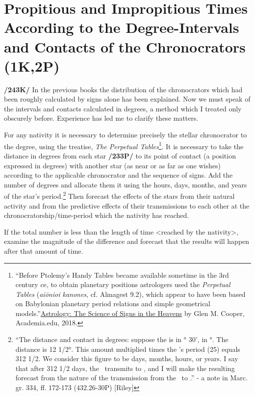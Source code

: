 \section{Propitious and Impropitious Times According to the Degree-Intervals and Contacts of the Chronocrators (1K,2P)}
\textbf{/243K/} In the previous books the distribution of the chronocrators which had been roughly calculated by signs alone has been explained. Now we must speak of the intervals and contacts calculated in degrees, a method which I treated only obscurely before. Experience has led me to clarify these matters.

For any nativity it is necessary to determine precisely the stellar chronocrator to the degree, using the treatise, \textsl{The Perpetual Tables}\footnote{``Before Ptolemy’s Handy Tables became available sometime in the 3rd century ce, to obtain planetary positions astrologers used the \textsl{Perpetual Tables} (\textsl{aiōnioi kanones}, cf. Almagest 9.2), which appear to have been based on Babylonian planetary period relations and simple geometrical models.''\href{https://www.academia.edu/31038622/_Astrology_The_Science_of_Signs_in_the_Heavens_In_The_Oxford_Handbook_to_Science_and_Medicine_in_the_Classical_World_edited_by_P_T_Keyser_and_J_Scarborough_Oxford_PROOFS_2018_} {Astrology: The Science of Signs in the Heavens} by Glen M. Cooper, Academia.edu, 2018.}. It is necessary to take the distance in degrees from each star \textbf{/233P/} to its point of contact (a position expressed in degrees) with another star (as near or as far as one wishes) according to the applicable chronocrator and the sequence of signs. Add the number of degrees and allocate them it using the hours, days, months, and years of the star’s period.\footnote{“The distance and contact in degrees: suppose the \Moon\xspace is in \Virgo\xspace 21° 30', \Saturn\xspace in °. The distance is 12 1/2°. This amount multiplied times the \Moon’s period (25) equals 312 1/2. We consider this figure to be days, months, hours, or years. I say that after 312 1/2 days, the \Moon\, transmits to \Saturn, and I will make the resulting forecast from the nature of the transmission from the \Moon\, to \Saturn.” - a note in Marc. gr. 334, ff. 172-173 (432.26-30P) [Riley]} Then forecast the effects of the stars from their natural activity and from the predictive effects of their transmissions to each other at the chronocratorship/time-period which the nativity has reached. 

If the total number is less than the length of time <reached by the nativity>, examine the magnitude of the difference and forecast that the results will happen after that amount of time. 

